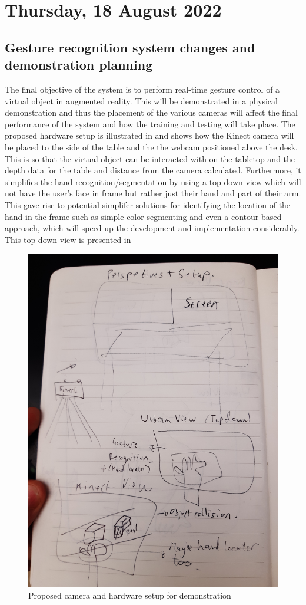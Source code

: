 \section[2022/08/18]{Thursday, 18 August 2022}

\subsection{Gesture recognition system changes and demonstration planning}

The final objective of the system is to perform real-time gesture control of a virtual object in augmented reality. This will be demonstrated in a physical demonstration and thus the placement of the various cameras will affect the final performance of the system and how the training and testing will take place. The proposed hardware setup is illustrated in  and shows how the Kinect camera will be placed to the side of the table and the the webcam positioned above the desk. This is so that the virtual object can be interacted with on the tabletop and the depth data for the table and distance from the camera calculated. Furthermore, it simplifies the hand recognition/segmentation by using a top-down view which will not have the user's face in frame but rather just their hand and part of their arm. This gave rise to potential simplifer solutions for identifying the location of the hand in the frame such as simple color segmenting and even a contour-based approach, which will speed up the development and implementation considerably. This top-down view is presented in 

\begin{figure}[h]
    \centering
    \includegraphics[width=0.7\linewidth]{figures/proposed_camera_setup.jpg}
    \caption{Proposed camera and hardware setup for demonstration}
    \label{fig:proposed_camera_setup}
\end{figure}


